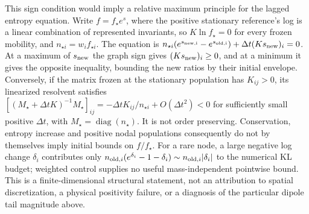 \documentclass[11pt,letterpaper]{article}
\newcommand{\diag}{\operatorname{diag}}
\begin{document}
This sign condition would imply a relative maximum principle for the
lagged entropy equation. Write $f=f_\star e^s$, where the positive stationary
reference's log is a linear combination of represented invariants, so
$K\ln f_\star=0$ for every frozen mobility, and $n_{\star i}=w_i f_{\star i}$.
The equation is
$n_{\star i}(e^{s_{\rm new,i}}-e^{s_{\rm old,i}})
+\Delta t(Ks_{\rm new})_i=0$.
At a maximum of $s_{\rm new}$ the graph sign gives
$(Ks_{\rm new})_i\ge0$, and at a minimum it gives the opposite inequality,
bounding the new ratios by their initial envelope. Conversely, if the matrix
frozen at the stationary population has $K_{ij}>0$, its linearized resolvent satisfies
$[(M_\star+\Delta tK)^{-1}M_\star]_{ij}
=-\Delta t K_{ij}/n_{\star i}+O(\Delta t^2)<0$
for sufficiently small positive $\Delta t$, with
$M_\star=\diag(n_\star)$. It is not order preserving.
Conservation, entropy increase and positive nodal populations consequently
do not by themselves imply initial bounds on $f/f_\star$.
For a rare node, a large negative log change $\delta_i$ contributes only
$n_{{\rm old},i}(e^{\delta_i}-1-\delta_i)
\sim n_{{\rm old},i}|\delta_i|$ to the numerical KL budget;
weighted control supplies no useful mass-independent pointwise bound.
This is a finite-dimensional structural statement, not an attribution to
spatial discretization, a physical positivity failure, or a diagnosis of the
particular dipole tail magnitude above.
\end{document}
